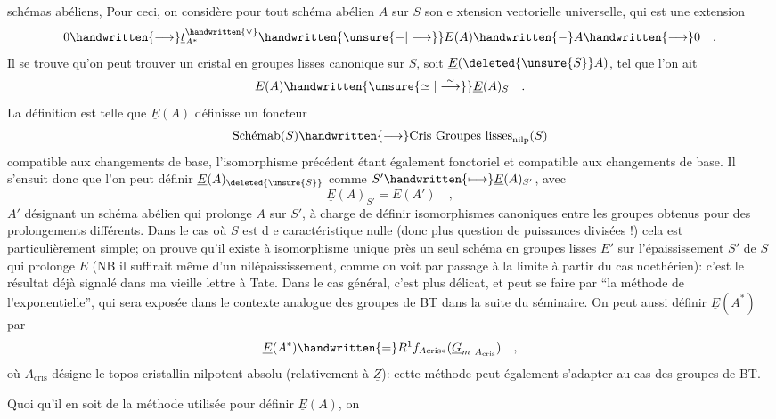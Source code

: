 schémas abéliens,  Pour ceci, on considère pour tout schéma abélien $A$ sur $S$ son e xtension vectorielle universelle, qui est une extension
\[
0\handwritten{\longrightarrow}\underline{t}_{A^*}^{\handwritten{\vee}}\handwritten{\unsure{\mathbin{-}|\longrightarrow}}E(A)\handwritten{\mathbin{-}}A\handwritten{\longrightarrow}0\quad .
\]
Il se trouve qu'on peut trouver un cristal en groupes lisses canonique sur $S$, soit $\underline{E}(\deleted{\unsure{S}}A)$, tel que l'on ait
\[
E(A)\handwritten{\unsure{\simeq|\overset{\sim}{\longrightarrow}}}\underline{E}(A)_S\quad .
\]
La définition est telle que  $\underline{E}(A)$ définisse un foncteur
\[
\text{Schémab}(S)\handwritten{\longrightarrow}\text{Cris Groupes lisses}_{\mathrm{nilp}}(S)
\]
compatible aux changements de base, l'isomorphisme précédent étant également fonctoriel et compatible aux changements de base. Il s'ensuit donc que l'on peut définir $\underline{E}(A)_{\deleted{\unsure{S}}}$ comme $S'\handwritten{\longmapsto}\underline{E}(A)_{S'}$, avec
\[
\underline{E}(A)_{S'}=E(A')\quad,
\]
$A'$ désignant un schéma abélien qui prolonge $A$ sur $S'$,  à charge de définir isomorphismes canoniques entre les groupes obtenus pour des prolongements différents. Dans le cas où $S$ est d e caractéristique nulle (donc plus question de puissances divisées !) cela est particulièrement simple; on prouve qu'il existe à isomorphisme \uline{unique} près un seul schéma en groupes lisses $E'$ sur l'épaississement $S'$ de $S$ qui prolonge $E$ (NB il suffirait même d'un nilépaississement, comme on voit par passage à la limite à partir du cas noethérien): c'est le résultat déjà signalé dans ma vieille lettre à Tate. Dans le cas général, c'est plus délicat, et peut se faire par ``la méthode de l'exponentielle'', qui sera exposée dans le contexte analogue des groupes de BT dans la suite du séminaire. On peut aussi définir $\underline{E}(A^*)$ par
\[
\underline{E}(A^*)\handwritten{=}R^1f_{A\mathrm{cris}*}(\underline{G}_{m\ A_{\mathrm{cris}}})\quad ,
\]
où $A_{\mathrm{cris}}$ désigne le topos cristallin  nilpotent absolu (relativement à $\underline{Z}$): cette méthode peut également s'adapter au cas des groupes de BT.

Quoi qu'il en soit de la méthode utilisée pour définir $\underline{E}(A)$, on
